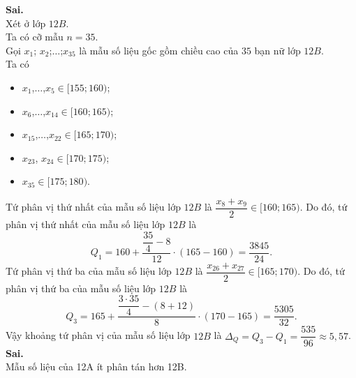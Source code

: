 \begin{ex}
{\begin{itemchoice}
			\itemch \textbf{Sai.}\\
			Xét ở lớp $12B$.\\
			Ta có cỡ mẫu $n=35$.\\
			Gọi $x_1 $; $x_2 $;$\ldots $;$x_{35}$ là mẫu số liệu gốc gồm chiều cao của $35$ bạn nữ lớp $12B$.\\
			Ta có
			\begin{itemize}
				\item $x_1$,$\ldots$,$ x_5 \in[155; 160)$;
				\item $x_6$,$\ldots$,$ x_{14} \in[160; 165)$;
				\item $x_{15}$,$\ldots$,$ x_{22} \in[165; 170)$;
				\item $x_{23}$, $x_{24} \in[170; 175)$;
				\item $x_{35} \in[175; 180)$.
			\end{itemize}
			Tứ phân vị thứ nhất của mẫu số liệu lớp $12B$ là $\dfrac{x_8+x_9}{2}\in[160; 165)$. Do đó, tứ phân vị thứ nhất của mẫu số liệu lớp $12B$ là
			$$Q_1=160+\dfrac{\dfrac{35}{4}-8}{12}\cdot(165-160)=\dfrac{3845}{24}.$$
			Tứ phân vị thứ ba của mẫu số liệu lớp $12B$ là $\dfrac{x_{26}+x_{27}}{2}\in[165; 170)$. Do đó, tứ phân vị thứ ba của mẫu số liệu lớp $12B$ là
			$$Q_3=165+\dfrac{\dfrac{3 \cdot 35}{4}-(8+12)}{8}\cdot(170-165)=\dfrac{5305}{32}.$$
			Vậy khoảng tứ phân vị của mẫu số liệu lớp $12B$ là $\Delta_Q=Q_3-Q_1=\dfrac{535}{96} \approx 5{,}57$.
			\itemch \textbf{Sai.}\\
			Mẫu số liệu của 12A ít phân tán hơn 12B.
		\end{itemchoice}
	}
\end{ex}

